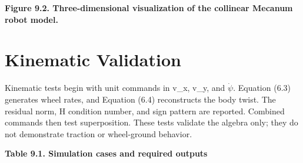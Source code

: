 \begin{center}\singlespacing
{}
\textbf{Figure 9.2. Three-dimensional visualization of the collinear Mecanum robot model.}
\end{center}

\section{Kinematic Validation}\label{kinematic-validation}

Kinematic tests begin with unit commands in v\_x, v\_y, and \ensuremath{\dot{\psi}}. Equation
(6.3) generates wheel rates, and Equation (6.4) reconstructs the body
twist. The residual norm, H condition number, and sign pattern are
reported. Combined commands then test superposition. These tests
validate the algebra only; they do not demonstrate traction or
wheel-ground behavior.

\par\medskip\noindent\singlespacing
{}
\textbf{Table 9.1. Simulation cases and required outputs}\par

